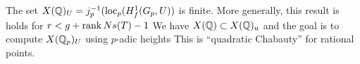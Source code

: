 \begin{lem}
The set $X(\mathbb{Q})_U= j_p^{-1}(\text{loc}_p(H_f^1(G_p,U))$ is finite. More generally, this result is holds for $r<g+\operatorname{rank} Ns(T)-1$ We have $X(\mathbb{Q}) \subset X(\mathbb{Q})_u$ and the goal is to compute $X(\mathbb{Q}_p)_U$ using $p$-adic heights This is ``quadratic Chabauty'' for rational points. 
\end{lem}
























